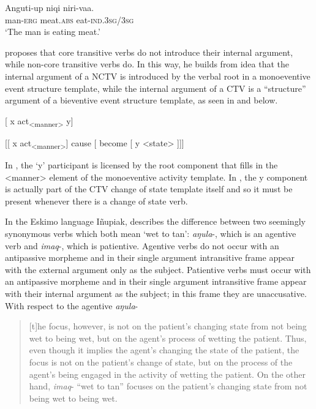 \documentclass[output=paper,colorlinks,citecolor=brown,modfonts,nonflat]{langsci/langscibook}
\begin{document}
    \ex \label{ex:basilico:4b}
    \gll Anguti-up  niqi    niri-vaa.\\
    man{}-\textsc{{erg}}  meat.\textsc{{abs}}  eat{}-\textsc{{ind}}.3\textsc{sg}/3\textsc{sg}
    \\
    \glt `The man is eating meat.'
    \z
    \z


\citet{Basilico2017} proposes that core transitive verbs do not introduce their internal argument, while non-core transitive verbs do. In this way, he builds from  idea that the internal argument of a NCTV is introduced by the verbal root in a monoeventive event structure template, while the internal argument of a CTV is a ``structure'' argument of a bieventive event structure template, as seen in  and  below.

\ea%
    \label{ex:basilico:5}
     {[} x act\textsubscript{<manner>} y{]}
    \z

\ea%
    \label{ex:basilico:6}
     {[}{[} x act\textsubscript{<manner>}{]} cause {[} become  {[} y <state> {]}{]}{]}
    \z

In , the ‘y’ participant is licensed by the root component that fills in the <manner> element of the monoeventive activity template. In , the y component is actually part of the CTV change of state template itself and so it must be present whenever there is a change of state verb.

In the Eskimo language Iñupiak, \citet{Nagai2006} describes the difference between two seemingly synonymous verbs which both mean ‘wet to tan’: \textit{aŋula}-, which is an agentive verb and \textit{imaq}{}-, which is patientive. Agentive verbs do not occur with an antipassive morpheme and in their single argument intransitive frame appear with the external argument only as the subject. Patientive verbs must occur with an antipassive morpheme and in their single argument intransitive frame appear with their internal argument as the subject; in this frame they are unaccusative. With respect to the agentive \textit{aŋula}{}-

\begin{quote}
[t]he focus, however, is not on the patient’s changing state from not being wet to being wet, but on the agent’s process of wetting the patient. Thus, even though it implies the agent’s changing the state of the patient, the focus is not on the patient’s change of state, but on the process of the agent’s being engaged in the activity of wetting the patient. On the other hand, \textit{imaq}{}- “wet to tan” focuses on the patient’s changing state from not being wet to being wet. \citep[215]{Nagai2006}
\end{quote}
\end{document}
